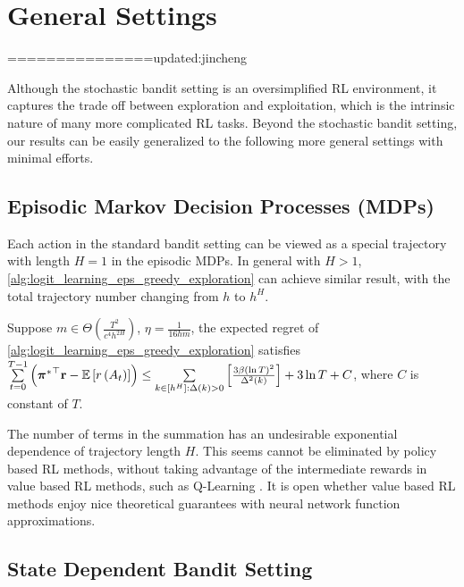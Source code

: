 \section{General Settings}
\label{sec:general_settings}

===============updated:jincheng

Although the stochastic bandit setting is an oversimplified RL environment, it captures the trade off between exploration and exploitation, which is the intrinsic nature of many more complicated RL tasks. Beyond the stochastic bandit setting, our results can be easily generalized to the following more general settings with minimal efforts.

\subsection{Episodic Markov Decision Processes (MDPs)}

Each action in the standard bandit setting can be viewed as a special trajectory with length $H = 1$ in the episodic MDPs. In general with $H > 1$, \cref{alg:logit_learning_eps_greedy_exploration} can achieve similar result, with the total trajectory number changing from $h$ to $h^H$.
\begin{thm}
\label{thm:episodic_mdp_setting}
     Suppose $m \in \Theta\left( \frac{T^2}{c^4 h^{2H}} \right)$, $\eta = \frac{ 1 }{16 h m}$, the expected regret of \cref{alg:logit_learning_eps_greedy_exploration} satisfies $\sum\limits_{t=0}^{T-1}{ \left( {{\boldsymbol{\pi}}^*}^\top {\mathbf{r}} - {\mathbb{E}} \left[ r\left(A_t\right) \right] \right) } \le \sum\limits_{k \in [h^H] : \Delta(k) > 0}{ \left[ \frac{ 3 \beta \left( \ln{T} \right)^2}{\Delta^2(k)} \right] } + 3 \ln{T} + C$, where $C$ is constant of $T$.
\end{thm}

The number of terms in the summation has an undesirable exponential dependence of trajectory length $H$. This seems cannot be eliminated by policy based RL methods, without taking advantage of the intermediate rewards in value based RL methods, such as Q-Learning \citep{jin2018q}. It is open whether value based RL methods enjoy nice theoretical guarantees with neural network function approximations.

\subsection{State Dependent Bandit Setting}

